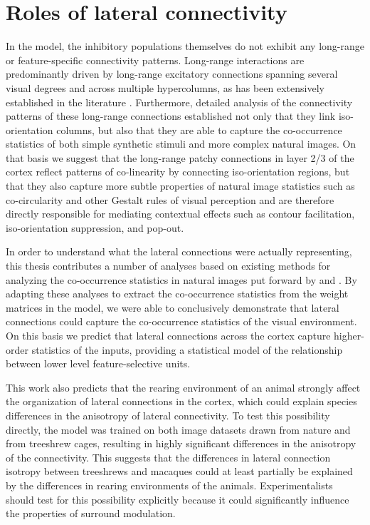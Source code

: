 \section{Roles of lateral connectivity}

In the model, the inhibitory populations themselves do not exhibit any
long-range or feature-specific connectivity patterns. Long-range
interactions are predominantly driven by long-range excitatory
connections spanning several visual degrees and across multiple
hypercolumns, as has been extensively established in the literature
\citep{Weliky1995, Bair2003}. Furthermore, detailed analysis of the
connectivity patterns of these long-range connections established not
only that they link iso-orientation columns, but also that they are
able to capture the co-occurrence statistics of both simple synthetic
stimuli and more complex natural images. On that basis we suggest that
the long-range patchy connections in layer 2/3 of the cortex 
reflect patterns of co-linearity by connecting iso-orientation regions, but
that they also capture more subtle properties of natural image
statistics such as co-circularity and other Gestalt rules of visual
perception and are therefore directly responsible for mediating
contextual effects such as contour facilitation, iso-orientation
suppression, and pop-out.

In order to understand what the lateral connections were actually
representing, this thesis contributes a number of analyses based on
existing methods for analyzing the co-occurrence statistics in natural
images put forward by \cite{Geisler2001} and
\cite{Perrinet2015}. By adapting these analyses to extract the
co-occurrence statistics from the weight matrices in the model, we were
able to conclusively demonstrate that lateral connections could
capture the co-occurrence statistics of the visual environment. On
this basis we predict that lateral connections across the cortex
capture higher-order statistics of the inputs, providing a statistical
model of the relationship between lower level feature-selective units.

This work also predicts that the rearing environment of an
animal strongly affect the organization of lateral connections in the
cortex, which could explain species differences in the anisotropy of
lateral connectivity. To test this possibility directly, the model was
trained on both image datasets drawn from nature and from treeshrew
cages, resulting in highly significant differences in the
anisotropy of the connectivity. This suggests that the differences in
lateral connection isotropy between treeshrews \citep{Bosking1997} and
macaques \citep{Angelucci2002} could at least partially be explained
by the differences in rearing environments of the
animals. Experimentalists should test for this possibility explicitly
because it could significantly influence the properties of surround
modulation.

